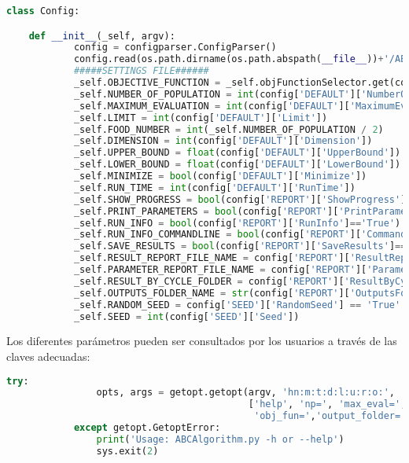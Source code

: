 \documentclass{article}
\begin{document}
\begin{lstlisting}[language=Python]
class Config:

    def __init__(_self, argv):
            config = configparser.ConfigParser()
            config.read(os.path.dirname(os.path.abspath(__file__))+'/ABC.ini')
            #####SETTINGS FILE######
            _self.OBJECTIVE_FUNCTION = _self.objFunctionSelector.get(config['DEFAULT']['ObjectiveFunction'], "Error")
            _self.NUMBER_OF_POPULATION = int(config['DEFAULT']['NumberOfPopulation'])
            _self.MAXIMUM_EVALUATION = int(config['DEFAULT']['MaximumEvaluation'])
            _self.LIMIT = int(config['DEFAULT']['Limit'])
            _self.FOOD_NUMBER = int(_self.NUMBER_OF_POPULATION / 2)
            _self.DIMENSION = int(config['DEFAULT']['Dimension'])
            _self.UPPER_BOUND = float(config['DEFAULT']['UpperBound'])
            _self.LOWER_BOUND = float(config['DEFAULT']['LowerBound'])
            _self.MINIMIZE = bool(config['DEFAULT']['Minimize'])
            _self.RUN_TIME = int(config['DEFAULT']['RunTime'])
            _self.SHOW_PROGRESS = bool(config['REPORT']['ShowProgress']=='True')
            _self.PRINT_PARAMETERS = bool(config['REPORT']['PrintParameters']=='True')
            _self.RUN_INFO = bool(config['REPORT']['RunInfo']=='True')
            _self.RUN_INFO_COMMANDLINE = bool(config['REPORT']['CommandLine']=='True')
            _self.SAVE_RESULTS = bool(config['REPORT']['SaveResults']=='True')
            _self.RESULT_REPORT_FILE_NAME = config['REPORT']['ResultReportFileName']
            _self.PARAMETER_REPORT_FILE_NAME = config['REPORT']['ParameterReportFileName']
            _self.RESULT_BY_CYCLE_FOLDER = config['REPORT']['ResultByCycleFolder']
            _self.OUTPUTS_FOLDER_NAME = str(config['REPORT']['OutputsFolderName'])
            _self.RANDOM_SEED = config['SEED']['RandomSeed'] == 'True'
            _self.SEED = int(config['SEED']['Seed'])

\end{lstlisting}


Los diferentes parámetros pueden ser consultados por los usuarios a través de las claves adecuadas:

\begin{lstlisting}[language=Python]
 try:
                opts, args = getopt.getopt(argv, 'hn:m:t:d:l:u:r:o:',
                                           ['help', 'np=', 'max_eval=','trial=', 'dim=', 'lower_bound=', 'upper_bound=', 'runtime=',
                                            'obj_fun=','output_folder=','file_name=','param_name=','res_cycle_folder=','show_functions'])
            except getopt.GetoptError:
                print('Usage: ABCAlgorithm.py -h or --help')
                sys.exit(2)



\end{lstlisting}
\end{document}
